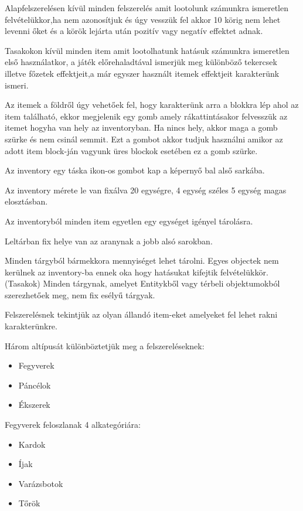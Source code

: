 Alapfelszerelésen kívül minden felszerelés amit lootolunk számunkra ismeretlen felvételükkor,ha nem azonosítjuk és úgy vesszük fel akkor 10 körig nem lehet levenni őket és a körök lejárta után pozitív vagy negatív effektet adnak.

Tasakokon kívül minden item amit lootolhatunk hatásuk számunkra ismeretlen első használatkor, a játék előrehaladtával ismerjük meg különböző tekercsek illetve főzetek effektjeit,a már egyszer használt itemek effektjeit karakterünk ismeri.
\newpage
{}

Az itemek a földről úgy vehetőek fel, hogy karakterünk arra a blokkra lép ahol az item található, ekkor megjelenik egy gomb amely rákattintásakor felvesszük az itemet hogyha van hely az inventoryban. Ha nincs hely, akkor maga a gomb szürke és nem csinál semmit. Ezt a gombot akkor tudjuk használni amikor az adott item block-ján vagyunk üres blockok esetében ez a gomb szürke.


Az inventory egy táska ikon-os gombot kap a képernyő bal alső sarkába.

Az inventory mérete le van fixálva 20 egységre, 4 egység széles 5 egység magas elosztásban.

Az inventoryból minden item egyetlen egy egységet igényel tárolásra.

Leltárban fix helye van az aranynak a jobb alsó sarokban.

Minden tárgyból bármekkora mennyiséget lehet tárolni.
Egyes objectek nem kerülnek az inventory-ba ennek oka hogy hatásukat kifejtik felvételükkör. (Tasakok)
Minden tárgynak, amelyet Entitykből vagy térbeli objektumokból szerezhetőek meg, nem fix esélyű tárgyak.


Felszerelésnek tekintjük az olyan állandó item-eket amelyeket fel lehet rakni karakterünkre.

Három altípusát különböztetjük meg a felszereléseknek:
\begin{itemize}
  \item Fegyverek
  \item Páncélok
  \item Ékszerek
\end{itemize}

Fegyverek feloszlanak 4 alkategóriára:
\begin{itemize}
  \item Kardok
  \item Íjak
  \item Varázsbotok
  \item Tőrök
\end{itemize}


